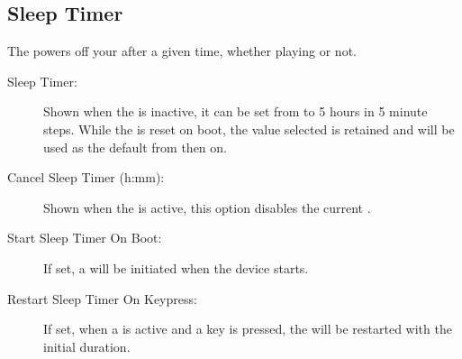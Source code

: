 \subsection{Sleep Timer}
  The  powers off your \dap{} after a given time, whether
  playing or not.
  \begin{description}
    \item[Sleep Timer:]
      Shown when the  is inactive, it can be set from
       to 5 hours in 5 minute steps.
      While the  is reset on boot, the value selected is
      retained and will be used as the default from then on.
    \item[Cancel Sleep Timer (h:mm):]
      Shown when the  is active, this option disables the
      current .
    \item[Start Sleep Timer On Boot:]
      If set, a  will be initiated when the device
      starts.
    \item[Restart Sleep Timer On Keypress:]
      If set, when a  is active and a key is pressed, the
       will be restarted with the initial duration.
  \end{description}
